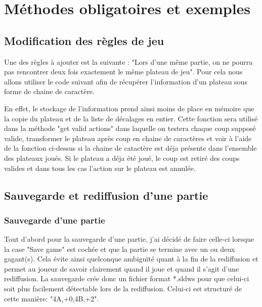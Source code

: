 \documentclass[utf8]{article}
\begin{document}
\newpage
\section {Méthodes obligatoires et exemples}

\subsection {Modification des règles de jeu}

\qquad Une des règles à ajouter est la suivante : "Lors d’une même partie, on ne pourra pas rencontrer deux fois exactement le même plateau de jeu".
Pour cela nous allons utiliser le code suivant afin de récupérer l'information d'un plateau sous forme de chaine de caractère.

\begin{figure}[H]
\begin{minipage}{\textwidth}
  \centering
	
  \label{fig:code_exemple}
\end{minipage}
\end{figure}

\qquad En effet, le stockage de l'information prend ainsi moins de place en mémoire que la copie du plateau et de la liste de décalages en entier. Cette fonction sera utilisé dans la méthode
"get valid actions" dans laquelle on testera chaque coup supposé valide, transformer le plateau après coup en chaine de caractères et voir à l'aide de la fonction ci-dessus si la chaine de catactère est déja présente dans l'ensemble des plateaux joués. Si le plateau a déja été joué, le coup est retiré des coups valides et dans tous les cas l'action sur le plateau est annulée.

\subsection{Sauvegarde et rediffusion d'une partie}
\subsubsection {Sauvegarde d'une partie}

\qquad Tout d'abord pour la sauvegarde d'une partie, j'ai décidé de faire celle-ci lorsque la case "Save game" est cochée et que la partie se termine avec un ou deux gagant(s). 
Cela évite ainsi quelconque ambiguïté quant à la fin de la rediffusion et permet au joueur de savoir clairement quand il joue et quand il s'agit d'une rediffusion.
La sauvegarde crée donc un  fichier format *.sldws pour que celui-ci soit plus facilement détectable lors de la rediffusion.
Celui-ci est structuré de cette manière: "4A,+0,4B,+2".
\end{document}

